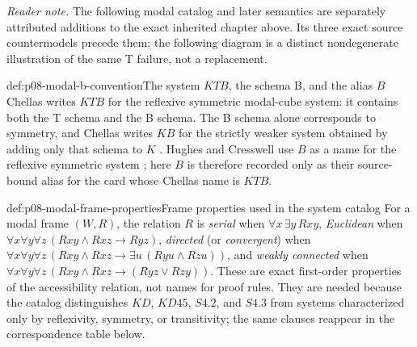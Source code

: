\noindent\textit{Reader note.} The following modal catalog and later semantics
are separately attributed additions to the exact inherited chapter above.
Its three exact source countermodels precede them; the following diagram is a distinct
nondegenerate illustration of the same T failure, not a replacement.

\begin{hbwarning}{def:p08-modal-b-convention}{The system \(KTB\), the schema B, and the alias \(B\)}
Chellas writes \(KTB\) for the reflexive symmetric modal-cube system: it
contains both the T schema and the B schema.  The B schema alone corresponds
to symmetry, and Chellas writes \(KB\) for the strictly weaker system obtained
by adding only that schema to \(K\) \cite{Chellas1980}.  Hughes and Cresswell
use \(B\) as a name for the reflexive symmetric system
\cite{HughesCresswell1996}; here \(B\) is therefore recorded only as their
source-bound alias for the card whose Chellas name is \(KTB\).
\end{hbwarning}

\begin{hbdefinition}{def:p08-modal-frame-properties}{Frame properties used in the system catalog}
For a modal frame \((W,R)\), the relation \(R\) is \emph{serial} when
\(\forall x\,\exists y\,Rxy\), \emph{Euclidean} when
\(\forall x\forall y\forall z\,(Rxy\land Rxz\to Ryz)\),
\emph{directed} (or \emph{convergent}) when
\(\forall x\forall y\forall z\,
(Rxy\land Rxz\to\exists u\,(Ryu\land Rzu))\), and
\emph{weakly connected} when
\(\forall x\forall y\forall z\,
(Rxy\land Rxz\to(Ryz\lor Rzy))\).  These are exact first-order
properties of the accessibility relation, not names for proof rules.  They are
needed because the catalog distinguishes \(KD\), \(KD45\), \(S4.2\), and
\(S4.3\) from systems
characterized only by reflexivity, symmetry, or transitivity; the same clauses
reappear in the correspondence table below.
\end{hbdefinition}

